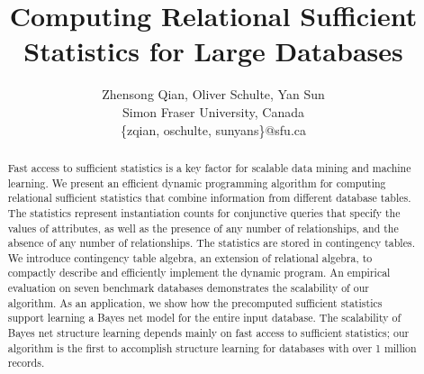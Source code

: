 \documentclass{vldb}
\begin{document}
\title{Computing Relational Sufficient Statistics for  Large Databases}

\author{
Zhensong Qian, Oliver Schulte, Yan Sun\\
 Simon Fraser University, Canada\\
\{zqian, oschulte, sunyans\}@sfu.ca
}

\maketitle  

\begin{abstract} 
Fast access to sufficient statistics is a key factor for scalable data mining and machine learning. We present an efficient dynamic programming algorithm for computing relational sufficient statistics that combine information from different database tables.  The statistics represent instantiation counts for conjunctive queries that specify the values of attributes, as well as the presence of any number of relationships, and the absence of any number of relationships. The statistics are stored in contingency tables. We introduce contingency table algebra, an extension of relational algebra, to compactly describe and efficiently implement the dynamic program. An empirical evaluation on seven benchmark databases demonstrates the scalability of our algorithm. As an application, we show how the precomputed sufficient statistics support learning a Bayes net model for the entire input database. The scalability of Bayes net structure learning depends mainly on fast access to sufficient statistics; our algorithm is the first to accomplish structure learning for databases with over 1 million records. \end{abstract}
 
\end{document}
